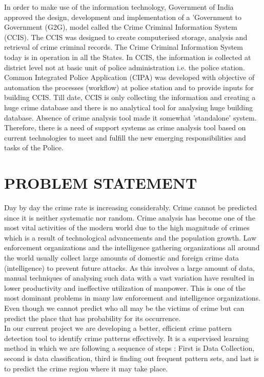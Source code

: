 \documentclass[12pt]{extreport}
\begin{document}
In order to make use of the information technology, Government of India approved the design, development and implementation of a 'Government to Government (G2G), model called the Crime Criminal Information System (CCIS). The CCIS was designed to create computerised storage, analysis and retrieval of crime criminal records. The Crime Criminal Information System today is in operation in all the States. In CCIS, the information is collected at district level not at basic unit of police administration i.e. the police station. Common Integrated Police Application (CIPA) was developed with objective of automation the processes (workflow) at police station and to provide inputs for building CCIS. Till date, CCIS is only collecting the information and creating a huge crime database and there is no analytical tool for analysing huge building database. Absence of crime analysis tool made it somewhat 'standalone' system. Therefore, there is a need of support systems as crime analysis tool based on current technologies to meet and fulfill the new emerging responsibilities and tasks of the Police. 


\section{PROBLEM STATEMENT}
\hspace*{5em}Day by day the crime rate is increasing considerably. Crime cannot be predicted since it is neither systematic nor random. Crime analysis has become one of the most vital activities of the modern world due to the high magnitude of crimes which is a result of technological advancements and the population growth. Law enforcement organizations and the intelligence gathering organizations all around the world usually collect large amounts of domestic and foreign crime data (intelligence) to prevent future attacks. As this involves a large amount of data, manual techniques of analysing such data with a vast variation have resulted in lower productivity and ineffective utilization of manpower. This is one of the most dominant problems in many law enforcement and intelligence organizations. Even though we cannot predict who all may be the victims of crime but can predict the place that has probability for its occurrence.\\

In our current project we are developing a better, efficient crime pattern detection tool to identify crime patterns effectively. It is a supervised learning method in which we are following a sequence of steps : First is Data Collection, second is data classification, third is finding out frequent pattern sets, and last is to predict the crime region where it may take place.\\
\end{document}
